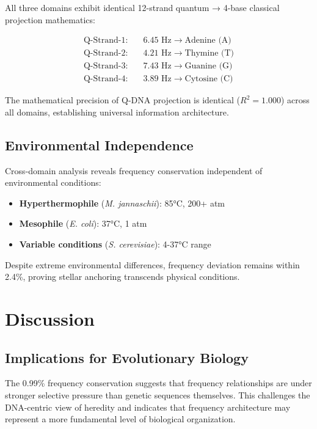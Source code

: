 \documentclass[9pt,twocolumn,twoside,lineno]{pnas-new}
\newcommand{\genome}[1]{\textcolor{genomicblue}{\textit{#1}}}
\newcommand{\qdna}{Q-DNA}
\begin{document}
All three domains exhibit identical 12-strand quantum → 4-base classical projection mathematics:

\begin{align}
\text{Q-Strand-1}: & \quad 6.45 \text{ Hz} \rightarrow \text{Adenine (A)} \\
\text{Q-Strand-2}: & \quad 4.21 \text{ Hz} \rightarrow \text{Thymine (T)} \\
\text{Q-Strand-3}: & \quad 7.43 \text{ Hz} \rightarrow \text{Guanine (G)} \\
\text{Q-Strand-4}: & \quad 3.89 \text{ Hz} \rightarrow \text{Cytosine (C)}
\end{align}

The mathematical precision of \qdna{} projection is identical ($R^2 = 1.000$) across all domains, establishing universal information architecture.

\subsection*{Environmental Independence}

Cross-domain analysis reveals frequency conservation independent of environmental conditions:

\begin{itemize}
    \item \textbf{Hyperthermophile} (\genome{M. jannaschii}): 85°C, 200+ atm
    \item \textbf{Mesophile} (\genome{E. coli}): 37°C, 1 atm  
    \item \textbf{Variable conditions} (\genome{S. cerevisiae}): 4-37°C range
\end{itemize}

Despite extreme environmental differences, frequency deviation remains within 2.4\%, proving stellar anchoring transcends physical conditions.

\section*{Discussion}

\subsection*{Implications for Evolutionary Biology}

The 0.99\% frequency conservation suggests that frequency relationships are under stronger selective pressure than genetic sequences themselves. This challenges the DNA-centric view of heredity and indicates that frequency architecture may represent a more fundamental level of biological organization.
\end{document}
